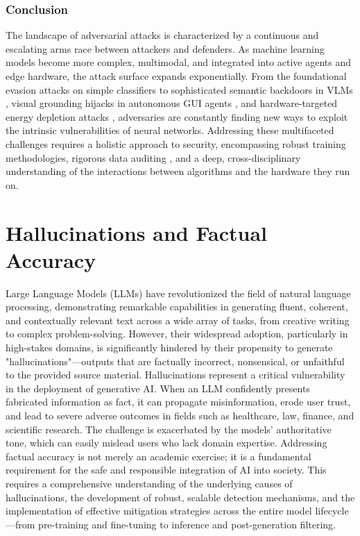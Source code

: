 \documentclass[11pt,a4paper]{article}
\begin{document}
\subsubsection{Conclusion}

The landscape of adversarial attacks is characterized by a continuous and escalating arms race between attackers and defenders. As machine learning models become more complex, multimodal, and integrated into active agents and edge hardware, the attack surface expands exponentially. From the foundational evasion attacks on simple classifiers to sophisticated semantic backdoors in VLMs \cite{Zhong_2025_Backdoor, Lyu_2024_Trojvlm}, visual grounding hijacks in autonomous GUI agents \cite{Ye_2025_Visualtrap}, and hardware-targeted energy depletion attacks \cite{Meftah_2025_Energy}, adversaries are constantly finding new ways to exploit the intrinsic vulnerabilities of neural networks. Addressing these multifaceted challenges requires a holistic approach to security, encompassing robust training methodologies, rigorous data auditing \cite{Smutny_2024_GAN}, and a deep, cross-disciplinary understanding of the interactions between algorithms and the hardware they run on.

\section{Hallucinations and Factual Accuracy}

Large Language Models (LLMs) have revolutionized the field of natural language processing, demonstrating remarkable capabilities in generating fluent, coherent, and contextually relevant text across a wide array of tasks, from creative writing to complex problem-solving. However, their widespread adoption, particularly in high-stakes domains, is significantly hindered by their propensity to generate "hallucinations"---outputs that are factually incorrect, nonsensical, or unfaithful to the provided source material. Hallucinations represent a critical vulnerability in the deployment of generative AI. When an LLM confidently presents fabricated information as fact, it can propagate misinformation, erode user trust, and lead to severe adverse outcomes in fields such as healthcare, law, finance, and scientific research. The challenge is exacerbated by the models' authoritative tone, which can easily mislead users who lack domain expertise. Addressing factual accuracy is not merely an academic exercise; it is a fundamental requirement for the safe and responsible integration of AI into society. This requires a comprehensive understanding of the underlying causes of hallucinations, the development of robust, scalable detection mechanisms, and the implementation of effective mitigation strategies across the entire model lifecycle---from pre-training and fine-tuning to inference and post-generation filtering.
\end{document}
